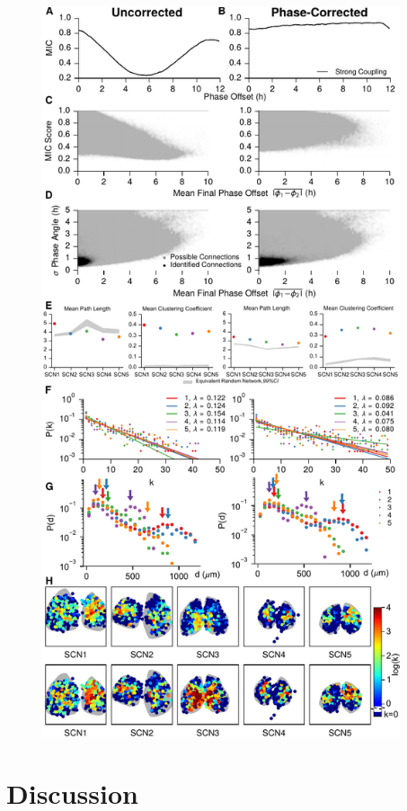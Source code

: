 \begin{figure}[p]
    \begin{center}
        \includegraphics[width=4.15in]{chap3/figures/s4_new.pdf}
    \end{center}
\end{figure}

\section{Discussion}

